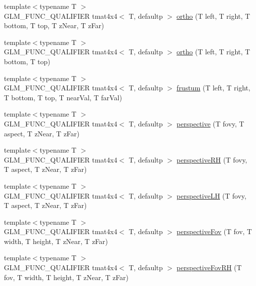 \begin{DoxyCompactItemize}
\item 
{\footnotesize template$<$typename T $>$ }\\G\+L\+M\+\_\+\+F\+U\+N\+C\+\_\+\+Q\+U\+A\+L\+I\+F\+I\+E\+R tmat4x4$<$ T, defaultp $>$ \hyperlink{group__gtc__matrix__transform_ga65280251de6e38580110a0577a43d8f8}{ortho} (T left, T right, T bottom, T top, T z\+Near, T z\+Far)
\item 
{\footnotesize template$<$typename T $>$ }\\G\+L\+M\+\_\+\+F\+U\+N\+C\+\_\+\+Q\+U\+A\+L\+I\+F\+I\+E\+R tmat4x4$<$ T, defaultp $>$ \hyperlink{group__gtc__matrix__transform_ga45b1b64f99255c07119b4f1aaed04dd7}{ortho} (T left, T right, T bottom, T top)
\item 
{\footnotesize template$<$typename T $>$ }\\G\+L\+M\+\_\+\+F\+U\+N\+C\+\_\+\+Q\+U\+A\+L\+I\+F\+I\+E\+R tmat4x4$<$ T, defaultp $>$ \hyperlink{group__gtc__matrix__transform_gada6deb989d4b553fe0f7e3279f3afae1}{frustum} (T left, T right, T bottom, T top, T near\+Val, T far\+Val)
\item 
{\footnotesize template$<$typename T $>$ }\\G\+L\+M\+\_\+\+F\+U\+N\+C\+\_\+\+Q\+U\+A\+L\+I\+F\+I\+E\+R tmat4x4$<$ T, defaultp $>$ \hyperlink{group__gtc__matrix__transform_gac3613dcb6c6916465ad5b7ad5a786175}{perspective} (T fovy, T aspect, T z\+Near, T z\+Far)
\item 
{\footnotesize template$<$typename T $>$ }\\G\+L\+M\+\_\+\+F\+U\+N\+C\+\_\+\+Q\+U\+A\+L\+I\+F\+I\+E\+R tmat4x4$<$ T, defaultp $>$ \hyperlink{group__gtc__matrix__transform_ga5a4fa9f8ffabb2294e48a18bf8fa2f5f}{perspective\+R\+H} (T fovy, T aspect, T z\+Near, T z\+Far)
\item 
{\footnotesize template$<$typename T $>$ }\\G\+L\+M\+\_\+\+F\+U\+N\+C\+\_\+\+Q\+U\+A\+L\+I\+F\+I\+E\+R tmat4x4$<$ T, defaultp $>$ \hyperlink{group__gtc__matrix__transform_ga34048da27c559f1ac8e9550d169dd6f3}{perspective\+L\+H} (T fovy, T aspect, T z\+Near, T z\+Far)
\item 
{\footnotesize template$<$typename T $>$ }\\G\+L\+M\+\_\+\+F\+U\+N\+C\+\_\+\+Q\+U\+A\+L\+I\+F\+I\+E\+R tmat4x4$<$ T, defaultp $>$ \hyperlink{group__gtc__matrix__transform_gae9146e2c550fc8646299e4b900238145}{perspective\+Fov} (T fov, T width, T height, T z\+Near, T z\+Far)
\item 
{\footnotesize template$<$typename T $>$ }\\G\+L\+M\+\_\+\+F\+U\+N\+C\+\_\+\+Q\+U\+A\+L\+I\+F\+I\+E\+R tmat4x4$<$ T, defaultp $>$ \hyperlink{group__gtc__matrix__transform_ga07cd8df791bf90dcb782645fe0b21261}{perspective\+Fov\+R\+H} (T fov, T width, T height, T z\+Near, T z\+Far)

\end{DoxyCompactItemize}
